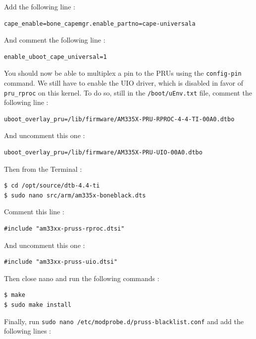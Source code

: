 \documentclass[]{report}
\begin{document}
\noindent Add the following line :

\begin{verbatim}
cape_enable=bone_capemgr.enable_partno=cape-universala
\end{verbatim}

\noindent And comment the following line :

\begin{verbatim}
enable_uboot_cape_universal=1
\end{verbatim}

You should now be able to multiplex a pin to the PRUs using the
\texttt{config-pin} command. We still
have to enable the UIO driver, which is disabled in favor of
\texttt{pru\_rproc} on this kernel. To do so, still in the
\texttt{/boot/uEnv.txt} file, comment the following line :

\begin{verbatim}
uboot_overlay_pru=/lib/firmware/AM335X-PRU-RPROC-4-4-TI-00A0.dtbo
\end{verbatim}

\noindent And uncomment this one :

\begin{verbatim}
uboot_overlay_pru=/lib/firmware/AM335X-PRU-UIO-00A0.dtbo
\end{verbatim}

\noindent Then from the Terminal :

\begin{verbatim}
$ cd /opt/source/dtb-4.4-ti
$ sudo nano src/arm/am335x-boneblack.dts
\end{verbatim}

\noindent Comment this line :

\begin{verbatim}
#include "am33xx-pruss-rproc.dtsi"
\end{verbatim}

\noindent And uncomment this one :

\begin{verbatim}
#include "am33xx-pruss-uio.dtsi"
\end{verbatim}

\noindent Then close nano and run the following commands :

\begin{verbatim}
$ make
$ sudo make install
\end{verbatim}

\noindent Finally, run
\texttt{sudo\ nano\ /etc/modprobe.d/pruss-blacklist.conf} and add the
following lines :
\end{document}
